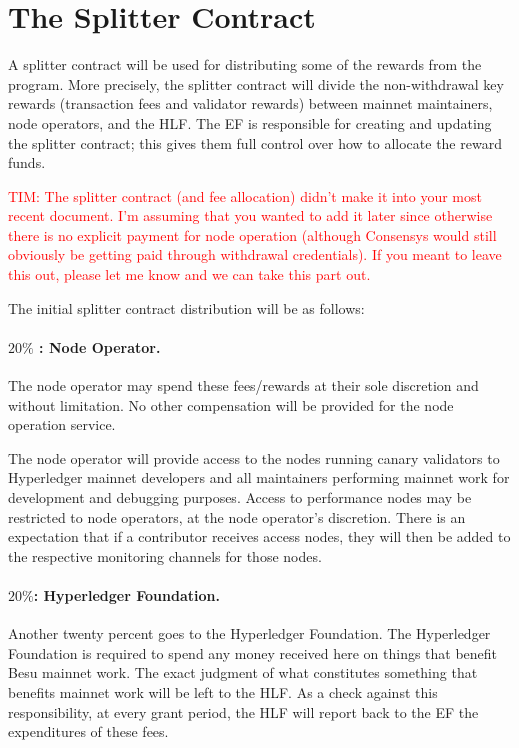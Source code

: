 
\section{The Splitter Contract} \label{sec:splitter}
A splitter contract will be used for distributing some of the rewards from the program.  More precisely, the splitter contract will divide the non-withdrawal key rewards (transaction fees and validator rewards) between mainnet maintainers, node operators, and the HLF.  The EF is responsible for creating and updating the splitter contract; this gives them full control over how to allocate the reward funds.

\textcolor{red}{TIM:  The splitter contract (and fee allocation) didn't make it into your most recent document.  I'm assuming that you wanted to add it later since otherwise there is no explicit payment for node operation (although Consensys would still obviously be getting paid through withdrawal credentials).  If you meant to leave this out, please let me know and we can take this part out.}

The initial splitter contract distribution will be as follows:

\paragraph{$20\%$ : \textbf{Node Operator}.}  The node operator may spend these fees/rewards at their sole discretion and without limitation. No other compensation will be provided for the node operation service.

The node operator will provide access to the nodes running canary validators to Hyperledger mainnet developers and all maintainers performing mainnet work for development and debugging purposes. Access to performance nodes may be restricted to node operators, at the node operator’s discretion. There is an expectation that if a contributor receives access nodes, they will then be added to the respective monitoring channels for those nodes.

\paragraph{$20\%$:  \textbf{Hyperledger Foundation}.}  Another twenty percent goes to the Hyperledger Foundation.  The Hyperledger Foundation is required to spend any money received here on things that benefit Besu mainnet work.  The exact judgment of what constitutes something that benefits mainnet work will be left to the HLF.  As a check against this responsibility, at every grant period, the HLF will report back to the EF the expenditures of these fees.

